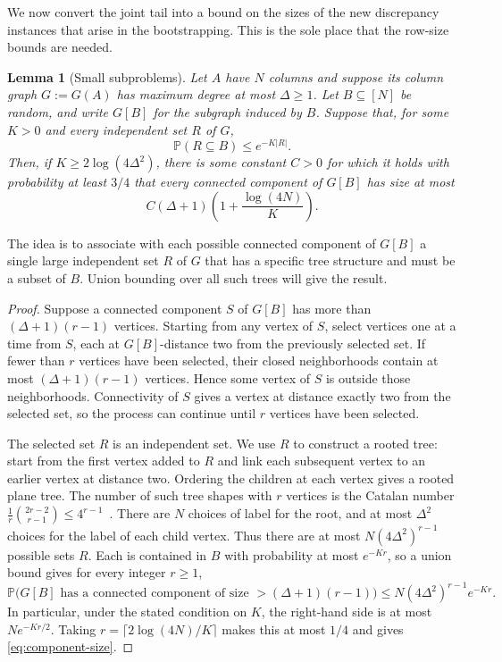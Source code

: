 \documentclass[reqno]{amsart}
\newtheorem{lemma}[theorem]{Lemma}
\theoremstyle{definition}
\newcommand{\Prob}{\mathbb P}
\begin{document}
We now convert the joint tail into a bound on the sizes of the new discrepancy instances that arise in the bootstrapping. This is the sole place that the row-size bounds are needed.

\begin{lemma}[Small subproblems]\label{lem:components}
Let $A$ have $N$ columns and suppose its column graph $G:=G(A)$ has maximum degree at most $\Delta\ge1$. Let $B\subseteq[N]$ be random, and write $G[B]$ for the subgraph induced by $B$. Suppose that, for some $K>0$ and every independent set $R$ of $G$,
\[ \Prob(R\subseteq B)\le e^{-K|R|}. \]
Then, if $K\ge2\log(4\Delta^2)$, there is some constant $C>0$ for which it holds with probability at least $3/4$ that every connected component of $G[B]$ has size at most
\begin{equation}\label{eq:component-size} C(\Delta+1)\left(1+\frac{\log(4N)}K\right). \end{equation}
\end{lemma}

The idea is to associate with each possible connected component of $G[B]$ a single large independent set $R$ of $G$ that has a specific tree structure and must be a subset of $B$. Union bounding over all such trees will give the result.


\begin{proof}
Suppose a connected component $S$ of $G[B]$ has more than $(\Delta+1)(r-1)$ vertices. Starting from any vertex of $S$, select vertices one at a time from $S$, each at $G[B]$-distance two from the previously selected set. If fewer than $r$ vertices have been selected, their closed neighborhoods contain at most $(\Delta+1)(r-1)$ vertices. Hence some vertex of $S$ is outside those neighborhoods. Connectivity of $S$ gives a vertex at distance exactly two from the selected set, so the process can continue until $r$ vertices have been selected.

The selected set $R$ is an independent set. We use $R$ to construct a rooted tree: start from the first vertex added to $R$ and link each subsequent vertex to an earlier vertex at distance two. Ordering the children at each vertex gives a rooted plane tree. The number of such tree shapes with $r$ vertices is the Catalan number $\frac1r\binom{2r-2}{r-1}\le4^{r-1}$~\cite{StanleyEC2}. There are $N$ choices of label for the root, and at most $\Delta^2$ choices for the label of each child vertex. Thus there are at most $N(4\Delta^2)^{r-1}$ possible sets $R$. Each is contained in $B$ with probability at most $e^{-Kr}$, so a union bound gives for every integer $r\ge1$,
\begin{equation}\label{eq:component-probability} \Prob\bigl(G[B]\text{ has a connected component of size } >(\Delta+1)(r-1)\bigr) \le N(4\Delta^2)^{r-1}e^{-Kr}. \end{equation}
In particular, under the stated condition on $K$, the right-hand side is at most $Ne^{-Kr/2}$. Taking $r=\lceil2\log(4N)/K\rceil$ makes this at most $1/4$ and gives \eqref{eq:component-size}.
\end{proof}
\end{document}
